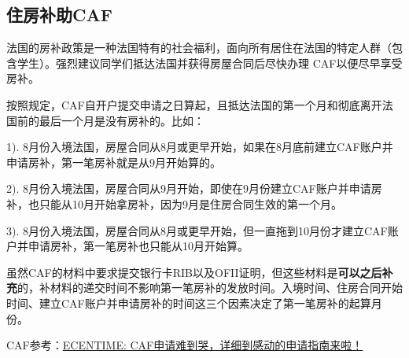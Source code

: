 \subsection{住房补助CAF}

法国的房补政策是一种法国特有的社会福利，面向所有居住在法国的特定人群（包含学生）。强烈建议同学们抵达法国并获得房屋合同后尽快办理 CAF以便尽早享受房补。

按照规定，CAF自开户提交申请之日算起，且抵达法国的第一个月和彻底离开法国前的最后一个月是没有房补的。比如：

1). 8月份入境法国，房屋合同从8月或更早开始，如果在8月底前建立CAF账户并申请房补，第一笔房补就是从9月开始算的。 

2). 8月份入境法国，房屋合同从9月开始，即使在9月份建立CAF账户并申请房补，也只能从10月开始拿房补，因为9月是住房合同生效的第一个月。 

3). 8月份入境法国，房屋合同从8月或更早开始，但一直拖到10月份才建立CAF账户并申请房补，第一笔房补也只能从10月开始算。

虽然CAF的材料中要求提交银行卡RIB以及OFII证明，但这些材料是\textbf{可以之后补充}的，补材料的递交时间不影响第一笔房补的发放时间。入境时间、住房合同开始时间、建立CAF账户并申请房补的时间这三个因素决定了第一笔房补的起算月份。

CAF参考：\href{https://www.ecentime.com/article/demande-caf}{ECENTIME: CAF申请难到哭，详细到感动的申请指南来啦！}
